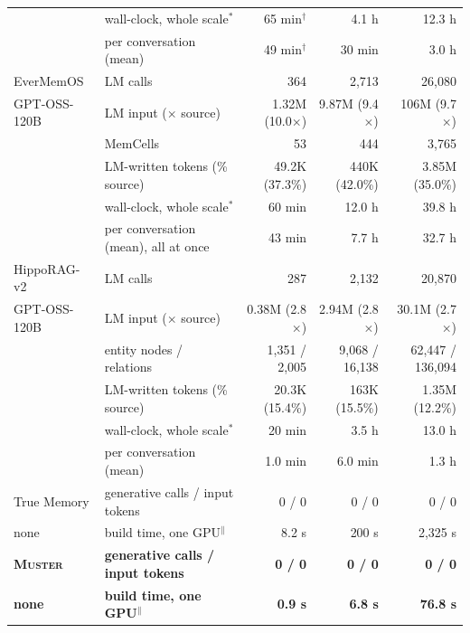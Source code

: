 \documentclass{article}
\newcommand{\ours}{\rowcolor{oursbg}}
\newcommand{\sys}{\textsc{Muster}}
\begin{document}
\begin{table}[!htbp]
\begin{tabular}{llrrr}
& wall-clock, whole scale$^\ast$ & 65 min$^\dagger$ & 4.1 h & 12.3 h \\
& per conversation (mean) & 49 min$^\dagger$ & 30 min & 3.0 h \\
\midrule
EverMemOS & LM calls & 364 & 2{,}713 & 26{,}080 \\
\quad GPT-OSS-120B & LM input ($\times$ source) & 1.32M (10.0$\times$) & 9.87M (9.4$\times$) & 106M (9.7$\times$) \\
& MemCells & 53 & 444 & 3{,}765 \\
& LM-written tokens (\% source) & 49.2K (37.3\%) & 440K (42.0\%) & 3.85M (35.0\%) \\
& wall-clock, whole scale$^\ast$ & 60 min & 12.0 h & 39.8 h \\
& per conversation (mean), all at once & 43 min & 7.7 h & 32.7 h \\
\midrule
HippoRAG-v2 & LM calls & 287 & 2{,}132 & 20{,}870 \\
\quad GPT-OSS-120B & LM input ($\times$ source) & 0.38M (2.8$\times$) & 2.94M (2.8$\times$) & 30.1M (2.7$\times$) \\
& entity nodes / relations & 1{,}351 / 2{,}005 & 9{,}068 / 16{,}138 & 62{,}447 / 136{,}094 \\
& LM-written tokens (\% source) & 20.3K (15.4\%) & 163K (15.5\%) & 1.35M (12.2\%) \\
& wall-clock, whole scale$^\ast$ & 20 min & 3.5 h & 13.0 h \\
& per conversation (mean) & 1.0 min & 6.0 min & 1.3 h \\
\midrule
True Memory & generative calls / input tokens & 0 / 0 & 0 / 0 & 0 / 0 \\
\quad none & build time, one GPU$^\|$ & 8.2 s & 200 s & 2{,}325 s \\
\midrule
\ours \textbf{\sys{}} & \textbf{generative calls / input tokens} & \textbf{0 / 0} & \textbf{0 / 0} & \textbf{0 / 0} \\
\ours \quad \textbf{none} & \textbf{build time, one GPU}$^\|$ & \textbf{0.9 s} & \textbf{6.8 s} & \textbf{76.8 s} \\
\bottomrule
\end{tabular}
\end{table}
\end{document}
